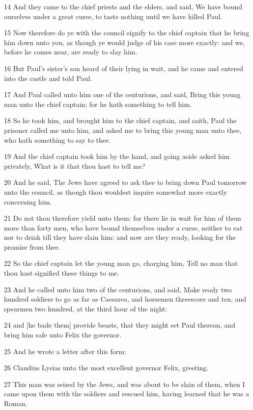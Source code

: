 \par 14 And they came to the chief priests and the elders, and said, We have bound ourselves under a great curse, to taste nothing until we have killed Paul.
\par 15 Now therefore do ye with the council signify to the chief captain that he bring him down unto you, as though ye would judge of his case more exactly: and we, before he comes near, are ready to slay him.
\par 16 But Paul's sister's son heard of their lying in wait, and he came and entered into the castle and told Paul.
\par 17 And Paul called unto him one of the centurions, and said, Bring this young man unto the chief captain; for he hath something to tell him.
\par 18 So he took him, and brought him to the chief captain, and saith, Paul the prisoner called me unto him, and asked me to bring this young man unto thee, who hath something to say to thee.
\par 19 And the chief captain took him by the hand, and going aside asked him privately, What is it that thou hast to tell me?
\par 20 And he said, The Jews have agreed to ask thee to bring down Paul tomorrow unto the council, as though thou wouldest inquire somewhat more exactly concerning him.
\par 21 Do not thou therefore yield unto them: for there lie in wait for him of them more than forty men, who have bound themselves under a curse, neither to eat nor to drink till they have slain him: and now are they ready, looking for the promise from thee.
\par 22 So the chief captain let the young man go, charging him, Tell no man that thou hast signified these things to me.
\par 23 And he called unto him two of the centurions, and said, Make ready two hundred soldiers to go as far as Caesarea, and horsemen threescore and ten, and spearmen two hundred, at the third hour of the night:
\par 24 and [he bade them] provide beasts, that they might set Paul thereon, and bring him safe unto Felix the governor.
\par 25 And he wrote a letter after this form:
\par 26 Claudius Lysias unto the most excellent governor Felix, greeting.
\par 27 This man was seized by the Jews, and was about to be slain of them, when I came upon them with the soldiers and rescued him, having learned that he was a Roman.
